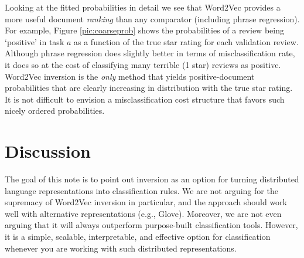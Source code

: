 \documentclass[11pt]{article}
\begin{document}
Looking at the fitted probabilities in detail we see that Word2Vec provides a
more useful document {\it ranking} than any comparator (including phrase
regression).  For example, Figure \ref{pic:coarseprob} shows the probabilities
of a review being `positive' in task $a$ as a function of the true star rating
for each validation review. Although phrase regression does slightly better in terms of misclassification rate, it does so at the cost of
classifying many terrible (1 star) reviews as positive.  Word2Vec inversion is
the {\it only} method that yields positive-document probabilities that are
clearly increasing in distribution with the true star rating.  It is not
difficult to envision a misclassification cost structure that favors such nicely ordered probabilities.

\section{Discussion}

The goal of this note is to point out inversion as an option for turning distributed language representations into classification rules.  We are not arguing for the supremacy of Word2Vec inversion in particular, and the approach should work well with alternative representations (e.g., Glove).  Moreover, we are not even arguing that it will always outperform purpose-built classification tools.  However, it is a simple, scalable, interpretable, and effective option for classification whenever you are working with such distributed representations.



\end{document}
